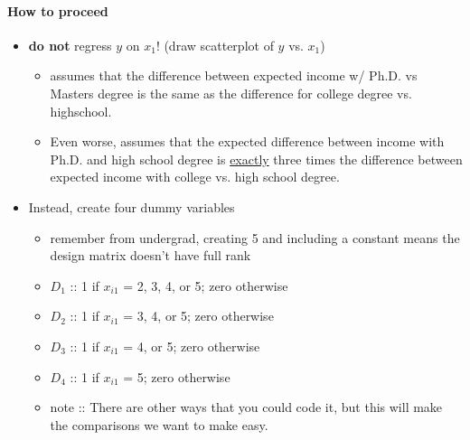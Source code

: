 \paragraph{How to proceed}
\begin{itemize}
\item \textbf{do not} regress $y$ on $x_1$! (draw scatterplot of $y$ vs. $x_1$)
\begin{itemize}
\item assumes that the difference between expected income w/
          Ph.D. vs Masters degree is the same as the difference for
          college degree vs. highschool.
\item Even worse, assumes that the expected difference between
          income with Ph.D. and high school degree is \underline{exactly} three
          times the difference between expected income with college
          vs. high school degree.
\end{itemize}
\item Instead, create four dummy variables
\begin{itemize}
\item remember from undergrad, creating 5 and including a constant
          means the design matrix doesn't have full rank
\item $D_1$ :: 1 if $x_{i1}$ = 2, 3, 4, or 5; zero otherwise
\item $D_2$ :: 1 if $x_{i1}$ = 3, 4, or 5; zero otherwise
\item $D_3$ :: 1 if $x_{i1}$ = 4, or 5; zero otherwise
\item $D_4$ :: 1 if $x_{i1}$ = 5; zero otherwise
\item note :: There are other ways that you could code it, but
                  this will make the comparisons we want to make easy.
\end{itemize}
\end{itemize}

